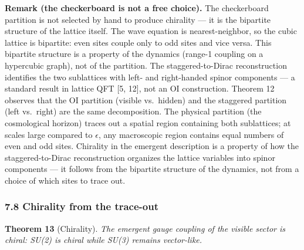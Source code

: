 \documentclass[
  11pt,
]{article}
\begin{document}
\textbf{Remark (the checkerboard is not a free choice).} The
checkerboard partition is not selected by hand to produce chirality ---
it is the bipartite structure of the lattice itself. The wave equation
is nearest-neighbor, so the cubic lattice is bipartite: even sites
couple only to odd sites and vice versa. This bipartite structure is a
property of the dynamics (range-1 coupling on a hypercubic graph), not
of the partition. The staggered-to-Dirac reconstruction identifies the
two sublattices with left- and right-handed spinor components --- a
standard result in lattice QFT {[}5, 12{]}, not an OI construction.
Theorem 12 observes that the OI partition (visible vs.~hidden) and the
staggered partition (left vs.~right) are the same decomposition. The
physical partition (the cosmological horizon) traces out a spatial
region containing both sublattices; at scales large compared to
\(\epsilon\), any macroscopic region contains equal numbers of even and
odd sites. Chirality in the emergent description is a property of how
the staggered-to-Dirac reconstruction organizes the lattice variables
into spinor components --- it follows from the bipartite structure of
the dynamics, not from a choice of which sites to trace out.

\hypertarget{chirality-from-the-trace-out}{%
\subsubsection{7.8 Chirality from the
trace-out}\label{chirality-from-the-trace-out}}

\textbf{Theorem 13} (Chirality). \emph{The emergent gauge coupling of
the visible sector is chiral: SU(2) is chiral while SU(3) remains
vector-like.}
\end{document}
